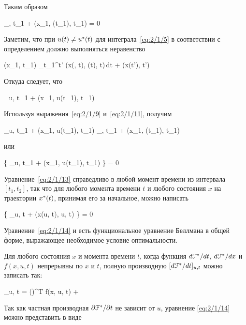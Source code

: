 Таким образом

    _{\optU, t_1} + \funcL\bigl(x_1, \optU(t_1), t_1\bigr) = 0 
\eeq

Заметим, что при $u(t) \neq u^{*}(t)$ для интеграла~\ref{eq:2/1/5} в соответствии с определением должно выполняться неравенство

    \optF(x_1, t_1) \leqslant \int\limits_{t_1}^{t'} \funcL\bigl(x(\optU, t), \optU(t), t\bigr)\,dt + \optF\bigl(x(t'), t'\bigr) 
\eeq

Откуда следует, что

    _{u, t_1} + \funcL\bigl(x_1, u(t_1), t_1\bigr)  
\eeq

Используя выражения~\vref{eq:2/1/9} и~\ref{eq:2/1/11}, получим

    _{u, t_1} + \funcL\bigl(x_1, u(t_1), t_1\bigr) \geqslant {}_{\optU, t_1} + \funcL\bigl(x_1, \optU(t_1), t_1\bigr) \text{,}
\eeq

или

     \biggl\{ _{u, t_1} + \funcL\bigl(x_1, u(t_1), t_1\bigr) \biggr\} = 0 
\eeq

Уравнение~\ref{eq:2/1/13} справедливо в любой момент времени из интервала $[t_1, t_2]$, так что для любого момента времени $t$ и любого состояния $x$ на траектории $x^{*}(t)$, принимая его за начальное, можно написать

     \biggl\{ _{u, t} + \funcL\bigl(x(u, t), u, t\bigr) \biggr\} = 0 
\eeq

Уравнение~\ref{eq:2/1/14} и есть функциональное уравнение Беллмана в общей форме, выражающее необходимое условие оптимальности.

Для любого состояния $x$ и момента времени $t$, когда функция $d \mathcal{F}^{*} / d t$, $d \mathcal{F}^{*} / d x$ и $f(x, u, t)$ непрерывны по $x$ и $t$, полную производную $[d \mathcal{F}^{*} / d t]_{u, t}$ можно записать так:

    _{u, t} = \biggl(\biggr)^T f(x, u, t) +  
\eeq

Так как частная производная $\partial {    \mathcal{F}  ^{*}  } / \partial {t}$ не зависит от $u$, уравнение \ref{eq:2/1/14} можно представить в виде

